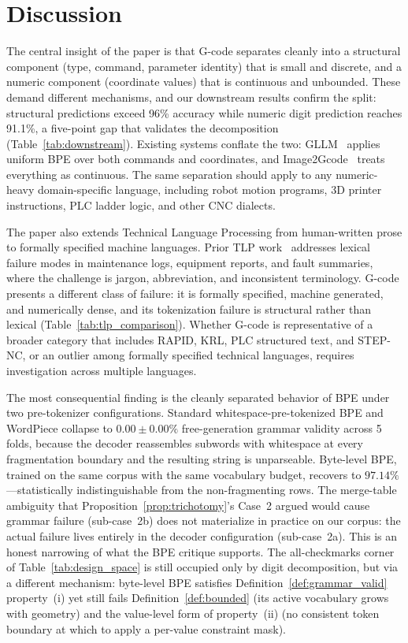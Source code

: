 \documentclass[11pt]{article}
\begin{document}
\section{Discussion}
\label{sec:discussion}

The central insight of the paper is that G-code separates cleanly into a structural component (type, command, parameter identity) that is small and discrete, and a numeric component (coordinate values) that is continuous and unbounded. These demand different mechanisms, and our downstream results confirm the split: structural predictions exceed 96\% accuracy while numeric digit prediction reaches 91.1\%, a five-point gap that validates the decomposition (Table~\ref{tab:downstream}). Existing systems conflate the two: GLLM~\cite{gllm} applies uniform BPE over both commands and coordinates, and Image2Gcode~\cite{image2gcode} treats everything as continuous. The same separation should apply to any numeric-heavy domain-specific language, including robot motion programs, 3D printer instructions, PLC ladder logic, and other CNC dialects.

The paper also extends Technical Language Processing from human-written prose to formally specified machine languages. Prior TLP work~\cite{tlp_cleaning,tlp_keyword,tlp_semiautonomous,tlp_nuclear,tlp_fault,tlp_foundational,tlp_adapting} addresses lexical failure modes in maintenance logs, equipment reports, and fault summaries, where the challenge is jargon, abbreviation, and inconsistent terminology. G-code presents a different class of failure: it is formally specified, machine generated, and numerically dense, and its tokenization failure is structural rather than lexical (Table~\ref{tab:tlp_comparison}). Whether G-code is representative of a broader category that includes RAPID, KRL, PLC structured text, and STEP-NC, or an outlier among formally specified technical languages, requires investigation across multiple languages.

The most consequential finding is the cleanly separated behavior of BPE under two pre-tokenizer configurations. Standard whitespace-pre-tokenized BPE and WordPiece collapse to $0.00 \pm 0.00\%$ free-generation grammar validity across 5 folds, because the decoder reassembles subwords with whitespace at every fragmentation boundary and the resulting string is unparseable. Byte-level BPE, trained on the same corpus with the same vocabulary budget, recovers to $97.14\%$---statistically indistinguishable from the non-fragmenting rows. The merge-table ambiguity that Proposition~\ref{prop:trichotomy}'s Case~2 argued would cause grammar failure (sub-case~2b) does not materialize in practice on our corpus: the actual failure lives entirely in the decoder configuration (sub-case~2a). This is an honest narrowing of what the BPE critique supports. The all-checkmarks corner of Table~\ref{tab:design_space} is still occupied only by digit decomposition, but via a different mechanism: byte-level BPE satisfies Definition~\ref{def:grammar_valid} property~(i) yet still fails Definition~\ref{def:bounded} (its active vocabulary grows with geometry) and the value-level form of property~(ii) (no consistent token boundary at which to apply a per-value constraint mask).
\end{document}
